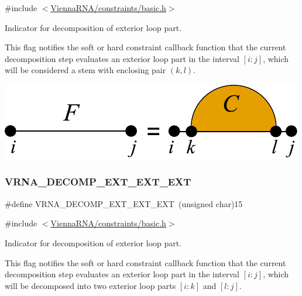 {\ttfamily \#include $<$\hyperlink{constraints_2basic_8h}{Vienna\+R\+N\+A/constraints/basic.\+h}$>$}



Indicator for decomposition of exterior loop part. 

This flag notifies the soft or hard constraint callback function that the current decomposition step evaluates an exterior loop part in the interval $[i:j]$, which will be considered a stem with enclosing pair $(k,l)$.

 
\begin{DoxyImageNoCaption}
  \mbox{\includegraphics[width=\textwidth,height=\textheight/2,keepaspectratio=true]{decomp_ext_stem}}
\end{DoxyImageNoCaption}
 \mbox{\label{group__constraints_ga803bd818b3f4b2b0a4a5cfa2f7dc2045}} 
\subsubsection{\texorpdfstring{V\+R\+N\+A\+\_\+\+D\+E\+C\+O\+M\+P\+\_\+\+E\+X\+T\+\_\+\+E\+X\+T\+\_\+\+E\+XT}{VRNA\_DECOMP\_EXT\_EXT\_EXT}}
{\footnotesize\ttfamily \#define V\+R\+N\+A\+\_\+\+D\+E\+C\+O\+M\+P\+\_\+\+E\+X\+T\+\_\+\+E\+X\+T\+\_\+\+E\+XT~(unsigned char)15}



{\ttfamily \#include $<$\hyperlink{constraints_2basic_8h}{Vienna\+R\+N\+A/constraints/basic.\+h}$>$}



Indicator for decomposition of exterior loop part. 

This flag notifies the soft or hard constraint callback function that the current decomposition step evaluates an exterior loop part in the interval $[i:j]$, which will be decomposed into two exterior loop parts $[i:k]$ and $[l:j]$.

